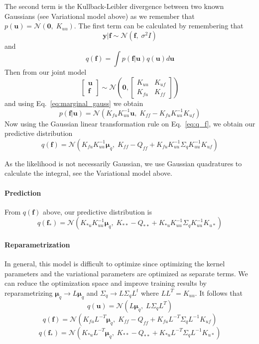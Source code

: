 \documentclass[5p,11pt]{article}
\begin{document}
The second term is the Kullback-Leibler divergence between two known Gaussians (see Variational model above) as we remember that $p(\bm{u}) = \mathcal{N}(\bm{0},\; K_{uu})$. The first term can be calculated by remembering that
$$ \bm{y}|\bm{f} \sim \mathcal{N}(\bm{f},\; \sigma^2I) $$
and
\begin{equation}
\label{eq:q_f}
q(\bm{f}) = \int p(\bm{f}|\bm{u})q(\bm{u}) d\bm{u}
\end{equation}
Then from our joint model
\begin{equation}
\begin{bmatrix}\bm{u}\\ \bm{f}\end{bmatrix} \sim \mathcal{N}\left(\bm{0}, \begin{bmatrix}K_{uu} & K_{uf}\\ K_{fu} & K_{ff}\end{bmatrix} \right)
\end{equation}
and using Eq.~\ref{eq:marginal_gauss} we obtain
$$ p(\bm{f}|\bm{u}) = \mathcal{N}(K_{fu}K_{uu}^{-1}\bm{u},\; K_{ff}-K_{fu}K_{uu}^{-1}K_{uf}) $$
Now using the Gaussian linear transformation rule on Eq.~\ref{eq:q_f}, we obtain our predictive distribution
$$ q(\bm{f}) = \mathcal{N}(K_{fu}K_{uu}^{-1}\bm{\mu}_q,\; K_{ff} - Q_{ff} + K_{fu}K_{uu}^{-1}\Sigma_qK_{uu}^{-1}K_{uf}) $$

As the likelihood is not necessarily Gaussian, we use Gaussian quadratures to calculate the integral, see the Variational model above.

\paragraph{Prediction} From $q(\bm{f})$ above, our predictive distribution is
$$ q(\bm{f}_*) = \mathcal{N}(K_{*u}K_{uu}^{-1}\bm{\mu}_q,\; K_{**} - Q_{**} + K_{*u}K_{uu}^{-1}\Sigma_qK_{uu}^{-1}K_{u*}) $$

\paragraph{Reparametrization}
In general, this model is difficult to optimize since optimizing the kernel parameters and the variational parameters are optimized as separate terms. We can reduce the optimization space and improve training results by reparametrizing $\bm{\mu}_q \to L\bm{\mu}_q$ and $\Sigma_q \to L\Sigma_qL^t$ where $LL^T = K_{uu}$. It follows that
$$ q(\bm{u}) = \mathcal{N}(L\bm{\mu}_q,\; L\Sigma_qL^T) $$
$$ q(\bm{f}) = \mathcal{N}(K_{fu}L^{-T}\bm{\mu}_q,\; K_{ff} - Q_{ff} + K_{fu}L^{-T}\Sigma_qL^{-1}K_{uf}) $$
$$ q(\bm{f}_*) = \mathcal{N}(K_{*u}L^{-T}\bm{\mu}_q,\; K_{**} - Q_{**} + K_{*u}L^{-T}\Sigma_qL^{-1}K_{u*}) $$
\end{document}
